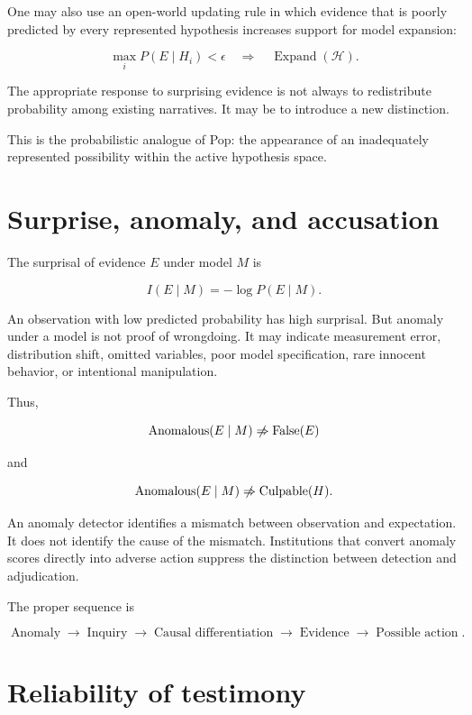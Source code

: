 One may also use an open-world updating rule in which evidence that is poorly predicted by every represented hypothesis increases support for model expansion:

\[
\max_iP(E\mid H_i)<\epsilon
\quad\Longrightarrow\quad
\operatorname{Expand}(\mathcal H).
\]

The appropriate response to surprising evidence is not always to redistribute probability among existing narratives. It may be to introduce a new distinction.

This is the probabilistic analogue of Pop: the appearance of an inadequately represented possibility within the active hypothesis space.

\section{Surprise, anomaly, and accusation}
\label{sec:a35}

The surprisal of evidence \(E\) under model \(M\) is

\[
I(E\mid M)
=
-\log P(E\mid M).
\]

An observation with low predicted probability has high surprisal. But anomaly under a model is not proof of wrongdoing. It may indicate measurement error, distribution shift, omitted variables, poor model specification, rare innocent behavior, or intentional manipulation.

Thus,

\[
\operatorname{Anomalous}(E\mid M)
\centernot\Rightarrow
\operatorname{False}(E)
\]

and

\[
\operatorname{Anomalous}(E\mid M)
\centernot\Rightarrow
\operatorname{Culpable}(H).
\]

An anomaly detector identifies a mismatch between observation and expectation. It does not identify the cause of the mismatch. Institutions that convert anomaly scores directly into adverse action suppress the distinction between detection and adjudication.

The proper sequence is

\[
\operatorname{Anomaly}
\to
\operatorname{Inquiry}
\to
\operatorname{Causal\ differentiation}
\to
\operatorname{Evidence}
\to
\operatorname{Possible\ action}.
\]

\section{Reliability of testimony}
\label{sec:a36}

